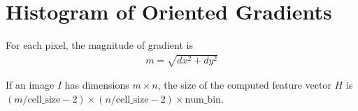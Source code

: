 \section{Histogram of Oriented Gradients}
For each pixel, the magnitude of gradient is 
\begin{align*}
m = \sqrt{dx^2 + dy^2}
\end{align*}

If an image $I$ has dimensions $m\times n$, the size of the computed feature
vector $H$ is $(m/\text{cell\_size} - 2) \times (n/\text{cell\_size} - 2)
\times \text{num\_bin}$.

\begin{figure}[h]
  \centering
  \subfigure[Depth HOG] {
    \includegraphics[trim={0cm 1.5cm 0cm 0cm},
}
\end{figure}
